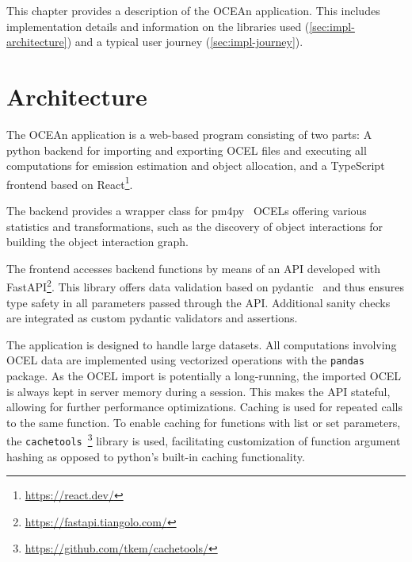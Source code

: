 

This chapter provides a description of the OCEAn application.
This includes implementation details and information on the libraries used (\autoref{sec:impl-architecture})
and a typical user journey (\autoref{sec:impl-journey}).


\section{Architecture}
\label{sec:impl-architecture}

The OCEAn application is a web-based program consisting of two parts:
A python backend for importing and exporting OCEL files and executing all computations for emission estimation and object allocation,
and a TypeScript~\cite{TypeScript} frontend based on
React\footnote{\url{https://react.dev/}}.

The backend provides a wrapper class for pm4py~\cite{Berti23pm4py} OCELs offering various statistics and transformations, such as the discovery of object interactions for building the object interaction graph.

The frontend accesses backend functions by means of an API developed with
FastAPI\footnote{\url{https://fastapi.tiangolo.com/}}.
This library offers data validation based on
pydantic~\cite{pydantic24}
and thus ensures type safety in all parameters passed through the API. Additional sanity checks are integrated as custom pydantic validators and assertions.

The application is designed to handle large datasets.
All computations involving OCEL data are implemented using vectorized operations with the \texttt{pandas}~\cite{pandas24,McKinney10pandas} package.
As the OCEL import is potentially a long-running, the imported OCEL is always kept in server memory during a session. This makes the API stateful, allowing for further performance optimizations. Caching is used for repeated calls to the same function. To enable caching for functions with list or set parameters, the
\texttt{cachetools}~\footnote{\url{https://github.com/tkem/cachetools/}}
library is used, facilitating customization of function argument hashing as opposed to python's built-in caching functionality.

